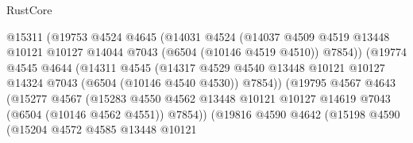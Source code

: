 \begin{lexlean}{RustCore}
\begin{coremodule}
                                @15311
                                (@19753
                                  @4524
                                  @4645
                                  (@14031
                                    @4524
                                    (@14037
                                      @4509
                                      @4519
                                      @13448
                                      @10121
                                      @10127
                                      @14044
                                      @7043
                                      (@6504 (@10146 @4519 @4510))
                                      @7854))
                                  (@19774
                                    @4545
                                    @4644
                                    (@14311
                                      @4545
                                      (@14317
                                        @4529
                                        @4540
                                        @13448
                                        @10121
                                        @10127
                                        @14324
                                        @7043
                                        (@6504 (@10146 @4540 @4530))
                                        @7854))
                                    (@19795
                                      @4567
                                      @4643
                                      (@15277
                                        @4567
                                        (@15283
                                          @4550
                                          @4562
                                          @13448
                                          @10121
                                          @10127
                                          @14619
                                          @7043
                                          (@6504 (@10146 @4562 @4551))
                                          @7854))
                                      (@19816
                                        @4590
                                        @4642
                                        (@15198
                                          @4590
                                          (@15204
                                            @4572
                                            @4585
                                            @13448
                                            @10121

\end{coremodule}
\end{lexlean}
